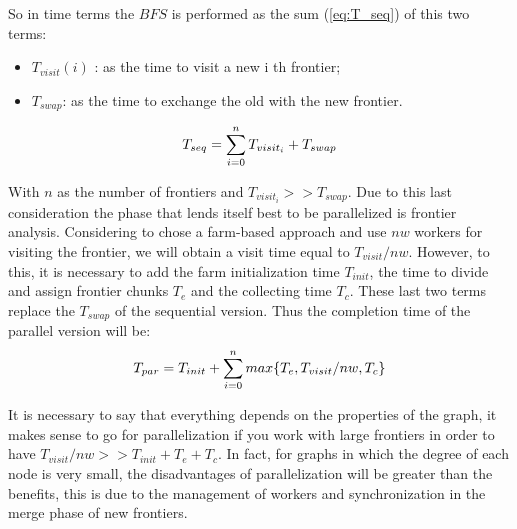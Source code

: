So in time terms the $BFS$ is performed as the sum (\ref{eq:T_seq}) of this two terms:

\begin{itemize}
    \item $T_{visit} (i)$ : as the time to visit a new i th frontier;
    \item $T_{swap}$: as the time to exchange the old with the new frontier.
\end{itemize}

\begin{equation}
\centering
T_{seq} = \displaystyle \sum_{i=0}^n T_{visit_i} + T_{swap}
\label{eq:T_seq}
\end{equation}

With $n$ as the number of frontiers and  $T_{visit_i} >>  T_{swap}$. Due to this last consideration the phase that lends itself best to be parallelized is frontier analysis. 
Considering to chose a farm-based approach and use $nw$ workers for visiting the frontier, we will obtain a visit time equal to $T_{visit}/nw$. However, to this, it is necessary to add the farm initialization time $T_{init}$, the time to divide and assign frontier chunks $T_e$ and the collecting time $T_c$. These last two terms replace the $T_{swap}$ of the sequential version.   
Thus the completion time of the parallel version will be:
\begin{equation}
\centering
T_{par} = T_{init} + \displaystyle \sum_{i=0}^n max\{T_e, T_{visit}/nw, T_c\}
\label{eq:T_par}
\end{equation}

It is necessary to say that everything depends on the properties of the graph, it makes sense to go for parallelization if you work with large frontiers in order to have $T_{visit}/nw >> T_{init} + T_e + T_c$. In fact, for graphs in which the degree of each node is very small, the disadvantages of parallelization will be greater than the benefits, this is due to the management of workers and synchronization in the merge phase of new frontiers. 

